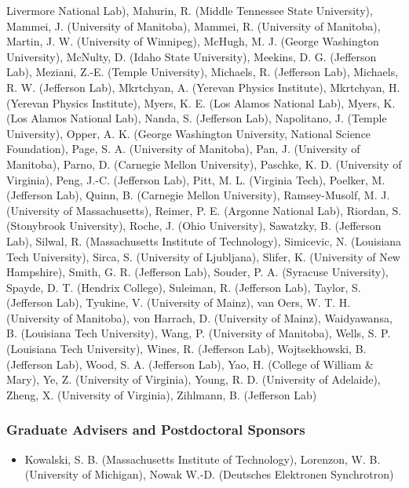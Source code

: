 \begin{itemize}
Livermore National Lab), Mahurin, R. (Middle Tennessee State University), Mammei, J. (University of Manitoba), Mammei, R. (University of Manitoba), Martin, J. W. (University of Winnipeg), McHugh, M. J. (George Washington University), McNulty, D. (Idaho State University), Meekins, D. G. (Jefferson Lab), Meziani, Z.-E. (Temple University), Michaels, R. (Jefferson Lab), Michaels, R. W. (Jefferson Lab), Mkrtchyan, A. (Yerevan Physics Institute), Mkrtchyan, H. (Yerevan Physics Institute), Myers, K. E. (Los Alamos National Lab), Myers, K. (Los Alamos National Lab), Nanda, S. (Jefferson Lab), Napolitano, J. (Temple University), Opper, A. K. (George Washington University, National Science Foundation), Page, S. A. (University of Manitoba), Pan, J. (University of Manitoba), Parno, D. (Carnegie Mellon University), Paschke, K. D. (University of Virginia), Peng, J.-C. (Jefferson Lab), Pitt, M. L. (Virginia Tech), Poelker, M. (Jefferson Lab), Quinn, B. (Carnegie Mellon University), Ramsey-Musolf, M. J. (University of Massachusetts), Reimer, P. E. (Argonne National Lab), Riordan, S. (Stonybrook University), Roche, J. (Ohio University), Sawatzky, B. (Jefferson Lab), Silwal, R. (Massachusetts Institute of Technology), Simicevic, N. (Louisiana Tech University), Sirca, S. (University of Ljubljana), Slifer, K. (University of New Hampshire), Smith, G. R. (Jefferson Lab), Souder, P. A. (Syracuse University), Spayde, D. T. (Hendrix College), Suleiman, R. (Jefferson Lab), Taylor, S. (Jefferson Lab), Tyukine, V. (University of Mainz), van Oers, W. T. H. (University of Manitoba), von Harrach, D. (University of Mainz), Waidyawansa, B. (Louisiana Tech University), Wang, P. (University of Manitoba), Wells, S. P. (Louisiana Tech University), Wines, R. (Jefferson Lab), Wojtsekhowski, B. (Jefferson Lab), Wood, S. A. (Jefferson Lab), Yao, H. (College of William \& Mary), Ye, Z. (University of Virginia), Young, R. D. (University of Adelaide), Zheng, X. (University of Virginia), Zihlmann, B. (Jefferson Lab)
\end{itemize}


\subsubsection*{Graduate Advisers and Postdoctoral Sponsors}
\begin{itemize}
 \item Kowalski, S. B. (Massachusetts Institute of Technology), Lorenzon, W. B. (University of Michigan), Nowak W.-D. (Deutsches Elektronen Synchrotron)
\end{itemize}

